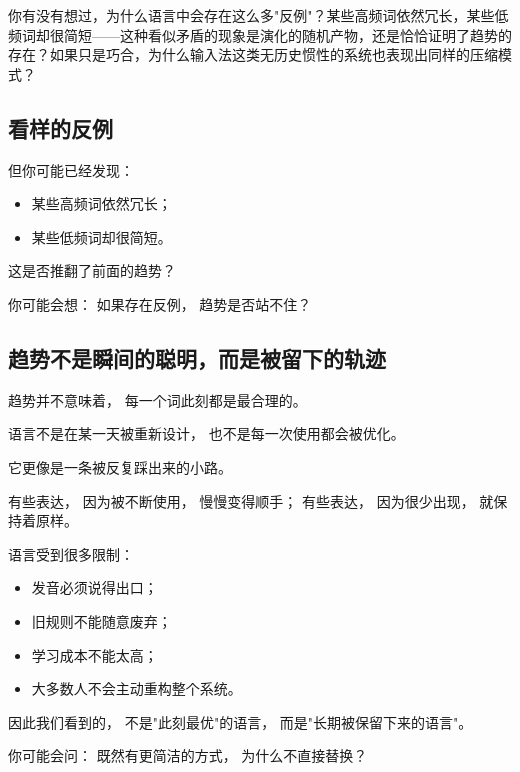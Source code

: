 \documentclass[../main.tex]{subfiles}
\begin{document}
\begin{questionbox}
	你有没有想过，为什么语言中会存在这么多"反例"？某些高频词依然冗长，某些低频词却很简短——这种看似矛盾的现象是演化的随机产物，还是恰恰证明了趋势的存在？如果只是巧合，为什么输入法这类无历史惯性的系统也表现出同样的压缩模式？
\end{questionbox}

\subsection{看样的反例}

但你可能已经发现：

\begin{itemize}
	\item 某些高频词依然冗长；
	\item 某些低频词却很简短。
\end{itemize}

这是否推翻了前面的趋势？

\begin{tcolorbox}[colback=yellow!5,title=\textit{读者行为预测}]
	你可能会想：
	如果存在反例，
	趋势是否站不住？
\end{tcolorbox}

\subsection{趋势不是瞬间的聪明，而是被留下的轨迹}

趋势并不意味着，
每一个词此刻都是最合理的。

语言不是在某一天被重新设计，
也不是每一次使用都会被优化。

它更像是一条被反复踩出来的小路。

有些表达，
因为被不断使用，
慢慢变得顺手；
有些表达，
因为很少出现，
就保持着原样。

语言受到很多限制：

\begin{itemize}
	\item 发音必须说得出口；
	\item 旧规则不能随意废弃；
	\item 学习成本不能太高；
	\item 大多数人不会主动重构整个系统。
\end{itemize}

因此我们看到的，
不是"此刻最优"的语言，
而是"长期被保留下来的语言"。

\begin{tcolorbox}[colback=yellow!5,title=\textit{读者行为预测}]
	你可能会问：
	既然有更简洁的方式，
	为什么不直接替换？
\end{tcolorbox}
\end{document}
